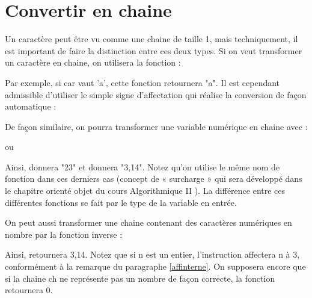 \section{Convertir en chaine}

	Un caractère peut être vu comme une chaine de taille 1, 
	mais techniquement, 
	il est important de faire la distinction entre ces deux types. 
	Si on veut transformer un caractère en chaine, 
	on utilisera la fonction :

	\begin{center}
	\end{center}

	Par exemple, si car vaut 'a', cette fonction retournera "a". 
	Il est cependant admissible d'utiliser le simple signe d'affectation 
	qui réalise la conversion de façon automatique :

	\begin{center}
	\end{center}

	De façon similaire, 
	on pourra transformer une variable numérique en chaine avec :

	\begin{center}
	\end{center}

	ou

	\begin{center}
	\end{center}

	Ainsi,  donnera "23" 
	et  donnera "3,14". 
	Notez qu'on utilise le même nom de fonction dans ces derniers cas 
	(concept de « surcharge » qui sera développé 
	dans le chapitre orienté objet du cours \og Algorithmique II \fg). 
	La différence entre ces différentes fonctions 
	se fait par le type de la variable en entrée.

	On peut aussi transformer une chaine 
	contenant des caractères numériques 
	en nombre par la fonction inverse :

	\begin{center}
	\end{center}

	Ainsi, 
	 retournera 3,14. 
	Notez que si n est un entier, 
	l'instruction  affectera n à 3, 
	conformément à la remarque du paragraphe \vref{affinterne}. 
	On supposera encore que si la chaine ch ne représente pas 
	un nombre de façon correcte, la fonction retournera 0.

